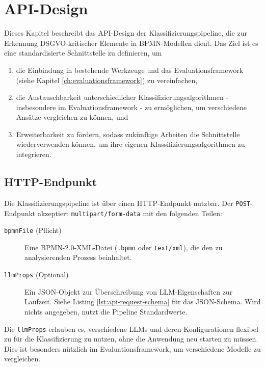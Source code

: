 \section{API-Design}\label{sec:api-design}

Dieses Kapitel beschreibt das API-Design der Klassifizierungspipeline, die zur Erkennung \ac{DSGVO}-kritischer Elemente in \ac{BPMN}-Modellen dient. Das Ziel ist es eine standardisierte Schnittstelle zu definieren, um

\begin{enumerate}
    \item die Einbindung in bestehende Werkzeuge und das Evaluationsframework (siehe Kapitel \ref{ch:evaluationsframework}) zu vereinfachen,
    \item die Austauschbarkeit unterschiedlicher Klassifizierungsalgorithmen - insbesondere im Evaluationsframework - zu ermöglichen, um verschiedene Ansätze vergleichen zu können, und
    \item Erweiterbarkeit zu fördern, sodass zukünftige Arbeiten die Schnittstelle wiederverwenden können, um ihre eigenen Klassifizierungsalgorithmen zu integrieren.
\end{enumerate}

\subsection*{HTTP-Endpunkt}

Die Klassifizierungspipeline ist über einen HTTP-Endpunkt nutzbar. Der \texttt{POST}-Endpunkt akzeptiert \texttt{multipart/form-data} mit den folgenden Teilen:

\begin{description}
    \item[\texttt{bpmnFile} (Pflicht)] Eine BPMN-2.0-XML-Datei (\texttt{.bpmn} oder \texttt{text/xml}), die den zu analysierenden Prozess beinhaltet.
    \item[\texttt{llmProps} (Optional)] Ein JSON-Objekt zur Überschreibung von \ac{LLM}-Eigenschaften zur Laufzeit. Siehe Listing \ref{lst:api-request-schema} für das JSON-Schema. Wird nichts angegeben, nutzt die Pipeline Standardwerte.
\end{description}

Die \texttt{llmProps} erlauben es, verschiedene \acp{LLM} und deren Konfigurationen flexibel zu für die Klassifizierung zu nutzen, ohne die Anwendung neu starten zu müssen. Dies ist besonders nützlich im Evaluationsframework, um verschiedene Modelle zu vergleichen.


